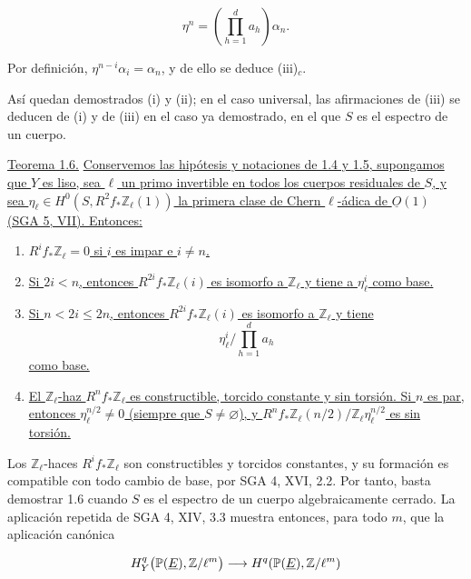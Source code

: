 \begin{equation*}
\eta^n=\left(\prod_{h=1}^d a_h\right)\alpha_n.
\end{equation*}

Por definición, $\eta^{n-i}\alpha_i=\alpha_n$, y de ello se deduce
(iii)$_c$.

Así quedan demostrados (i) y (ii); en el caso universal, las afirmaciones de
(iii) se deducen de (i) y de (iii) en el caso ya demostrado, en el que $S$
es el espectro de un cuerpo.

\medskip
\noindent\underline{Teorema 1.6.}\quad
\underline{Conservemos las hipótesis y notaciones de 1.4 y 1.5, supongamos
que $Y$ es liso, sea $\ell$ un primo invertible en todos los cuerpos
residuales de $S$, y sea
$\eta_\ell\in H^0(S,R^2f_*\mathbb Z_\ell(1))$ la primera clase de Chern
$\ell$-ádica de $\underline O(1)$ (SGA 5, VII). Entonces:}

\begin{enumerate}[label=(\roman*),leftmargin=2.6em]
\item \underline{$R^if_*\mathbb Z_\ell=0$ si $i$ es impar e $i\ne n$.}

\item \underline{Si $2i<n$, entonces $R^{2i}f_*\mathbb Z_\ell(i)$ es
isomorfo a $\mathbb Z_\ell$ y tiene a $\eta_\ell^i$ como base.}

\item \underline{Si $n<2i\leq2n$, entonces
$R^{2i}f_*\mathbb Z_\ell(i)$ es isomorfo a $\mathbb Z_\ell$ y tiene}
\begin{equation*}
\eta_\ell^i\bigg/\prod_{h=1}^d a_h
\end{equation*}
\underline{como base.}

\item \underline{El $\mathbb Z_\ell$-haz $R^nf_*\mathbb Z_\ell$ es
constructible, torcido constante y sin torsión. Si $n$ es par, entonces
$\eta_\ell^{n/2}\ne0$ (siempre que $S\ne\varnothing$), y
$R^nf_*\mathbb Z_\ell(n/2)/\mathbb Z_\ell\eta_\ell^{n/2}$ es sin torsión.}
\end{enumerate}

Los $\mathbb Z_\ell$-haces $R^if_*\mathbb Z_\ell$ son constructibles y
torcidos constantes, y su formación es compatible con todo cambio de base,
por SGA 4, XVI, 2.2. Por tanto, basta demostrar 1.6 cuando $S$ es el
espectro de un cuerpo algebraicamente cerrado. La aplicación repetida de
SGA 4, XIV, 3.3 muestra entonces, para todo $m$, que la aplicación canónica

\begin{equation*}
H_Y^q\bigl(\mathbb P(\underline E),\mathbb Z/\ell^m\bigr)
\longrightarrow H^q(\sisi{Y}{\mathbb P(\underline E)},\mathbb Z/\ell^m)
\end{equation*}

